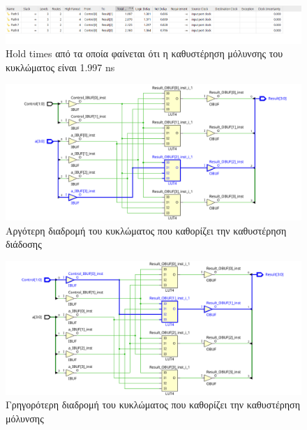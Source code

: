 \documentclass[11pt, a4paper]{report}
\begin{document}
\begin{figure}
  \includegraphics[width=\textwidth]{./images/alu-2/fast-report.png}
  \caption{Hold times από τα οποία φαίνεται ότι η καθυστέρηση μόλυνσης του κυκλώματος είναι 1.997 ns}
  \label{fig:fast}
\end{figure}

\begin{figure}
  \includegraphics[width=\textwidth]{./images/alu-2/slow-path.png}
  \caption{Αργότερη διαδρομή του κυκλώματος που καθορίζει την καθυστέρηση διάδοσης}
  \label{fig:slow_path}
\end{figure}

\begin{figure}
  \includegraphics[width=\textwidth]{./images/alu-2/fast-path.png}
  \caption{Γρηγορότερη διαδρομή του κυκλώματος που καθορίζει την καθυστέρηση μόλυνσης}
  \label{fig:fast_path}
\end{figure}
\end{document}
